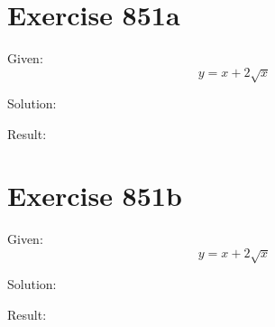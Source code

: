 \documentclass[a4paper, 10pt]{scrartcl}
\begin{document}
\section{Exercise 851a}

Given:
\[
y = x + 2\sqrt{x}
\]

Solution:

Result:

\section{Exercise 851b}

Given:
\[
y = x + 2\sqrt{x}
\]

Solution:

Result:
\end{document}
